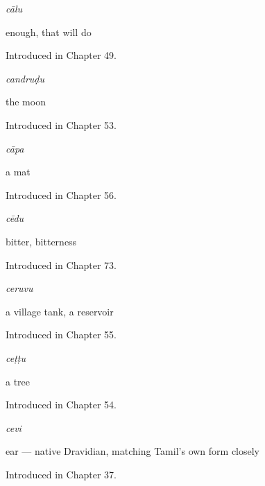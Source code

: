 \noindent\begin{minipage}[t]{\linewidth}
\raggedright
\textbf{}\enspace\emph{cālu}\par
\small enough, that will do\par
\footnotesize Introduced in Chapter 49.
\end{minipage}\par\medskip

\noindent\begin{minipage}[t]{\linewidth}
\raggedright
\textbf{}\enspace\emph{candruḍu}\par
\small the moon\par
\footnotesize Introduced in Chapter 53.
\end{minipage}\par\medskip

\noindent\begin{minipage}[t]{\linewidth}
\raggedright
\textbf{}\enspace\emph{cāpa}\par
\small a mat\par
\footnotesize Introduced in Chapter 56.
\end{minipage}\par\medskip

\noindent\begin{minipage}[t]{\linewidth}
\raggedright
\textbf{}\enspace\emph{cēdu}\par
\small bitter, bitterness\par
\footnotesize Introduced in Chapter 73.
\end{minipage}\par\medskip

\noindent\begin{minipage}[t]{\linewidth}
\raggedright
\textbf{}\enspace\emph{ceruvu}\par
\small a village tank, a reservoir\par
\footnotesize Introduced in Chapter 55.
\end{minipage}\par\medskip

\noindent\begin{minipage}[t]{\linewidth}
\raggedright
\textbf{}\enspace\emph{ceṭṭu}\par
\small a tree\par
\footnotesize Introduced in Chapter 54.
\end{minipage}\par\medskip

\noindent\begin{minipage}[t]{\linewidth}
\raggedright
\textbf{}\enspace\emph{cevi}\par
\small ear — native Dravidian, matching Tamil's own form closely\par
\footnotesize Introduced in Chapter 37.
\end{minipage}\par\medskip

